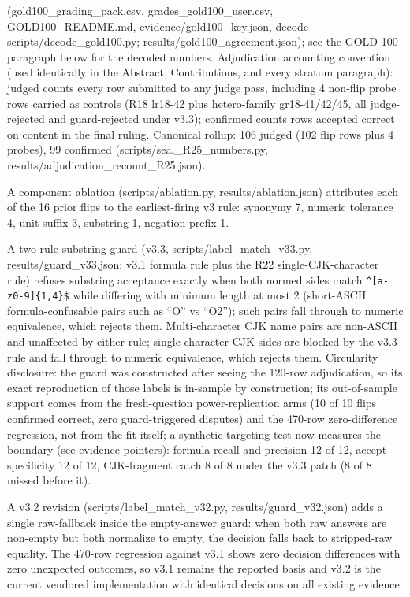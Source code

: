\documentclass[10pt]{article} %
\begin{document}
(gold100\_grading\_pack.csv, grades\_gold100\_user.csv, GOLD100\_README.md, evidence/gold100\_key.json, decode scripts/decode\_gold100.py; results/gold100\_agreement.json); see the GOLD-100 paragraph below for the decoded numbers. Adjudication accounting convention (used identically in the Abstract, Contributions, and every stratum paragraph): judged counts every row submitted to any judge pass, including 4 non-flip probe rows carried as controls (R18 lr18-42 plus hetero-family gr18-41/42/45, all judge-rejected and guard-rejected under v3.3); confirmed counts rows accepted correct on content in the final ruling. Canonical rollup: 106 judged (102 flip rows plus 4 probes), 99 confirmed (scripts/seal\_R25\_numbers.py, results/adjudication\_recount\_R25.json).

A component ablation (scripts/ablation.py, results/ablation.json) attributes each of the 16 prior flips to the earliest-firing v3 rule: synonymy 7, numeric tolerance 4, unit suffix 3, substring 1, negation prefix 1.

A two-rule substring guard (v3.3, scripts/label\_match\_v33.py, results/guard\_v33.json; v3.1 formula rule plus the R22 single-CJK-character rule) refuses substring acceptance exactly when both normed sides match \texttt{\^{}[a-z0-9]\{1,4\}\$} while differing with minimum length at most 2 (short-ASCII formula-confusable pairs such as ``O'' vs ``O2''); such pairs fall through to numeric equivalence, which rejects them. Multi-character CJK name pairs are non-ASCII and unaffected by either rule; single-character CJK sides are blocked by the v3.3 rule and fall through to numeric equivalence, which rejects them. Circularity disclosure: the guard was constructed after seeing the 120-row adjudication, so its exact reproduction of those labels is in-sample by construction; its out-of-sample support comes from the fresh-question power-replication arms (10 of 10 flips confirmed correct, zero guard-triggered disputes) and the 470-row zero-difference regression, not from the fit itself; a synthetic targeting test now measures the boundary (see evidence pointers): formula recall and precision 12 of 12, accept specificity 12 of 12, CJK-fragment catch 8 of 8 under the v3.3 patch (8 of 8 missed before it).

A v3.2 revision (scripts/label\_match\_v32.py, results/guard\_v32.json) adds a single raw-fallback inside the empty-answer guard: when both raw answers are non-empty but both normalize to empty, the decision falls back to stripped-raw equality. The 470-row regression against v3.1 shows zero decision differences with zero unexpected outcomes, so v3.1 remains the reported basis and v3.2 is the current vendored implementation with identical decisions on all existing evidence.
\end{document}

